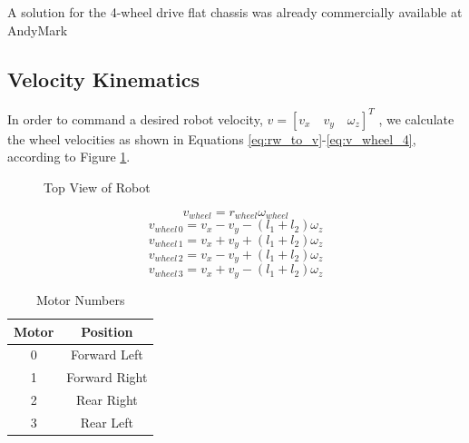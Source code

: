 \documentclass[letterpaper,12pt]{report}
\begin{document}
A solution for the 4-wheel drive flat chassis was already commercially
available at AndyMark
\subsection{Velocity Kinematics}
\label{sec:ar9331_vel_kin}

In order to command a desired robot velocity,
\begin{math}
    v= [ v_x \quad v_y \quad \omega_z ]^T
\end{math}
, we calculate the wheel velocities as shown in Equations
\ref{eq:rw_to_v}-\ref{eq:v_wheel_4}, according to Figure
\ref{fig:robot_top_view}.

\begin{figure}[h!]
  \centering
  
  \caption{Top View of Robot}
  \label{fig:robot_top_view}
\end{figure}

\begin{equation}
  v_{wheel}=r_{wheel}\omega_{wheel}
  \label{eq:rw_to_v}
\end{equation}
\begin{equation}
  v_{wheel\,0}=v_x-v_y-(l_1+l_2)\omega_z
  \label{eq:v_wheel_1}
\end{equation}
\begin{equation}
  v_{wheel\,1}=v_x+v_y+(l_1+l_2)\omega_z
  \label{eq:v_wheel_2}
\end{equation}
\begin{equation}
  v_{wheel\,2}=v_x-v_y+(l_1+l_2)\omega_z
  \label{eq:v_wheel_3}
\end{equation}
\begin{equation}
  v_{wheel\,3}=v_x+v_y-(l_1+l_2)\omega_z
  \label{eq:v_wheel_4}
\end{equation}

\begin{table}[h!]
  \centering
  \begin{tabular}{| c | c |}
    \hline
    \textbf{Motor} & \textbf{Position} \\
    \hline
    0 & Forward Left \\
    \hline
    1 & Forward Right \\
    \hline
    2 & Rear Right \\
    \hline
    3 & Rear Left \\
    \hline
  \end{tabular}
  \caption{Motor Numbers}
  \label{tab:motor_nums}
\end{table}
\end{document}
